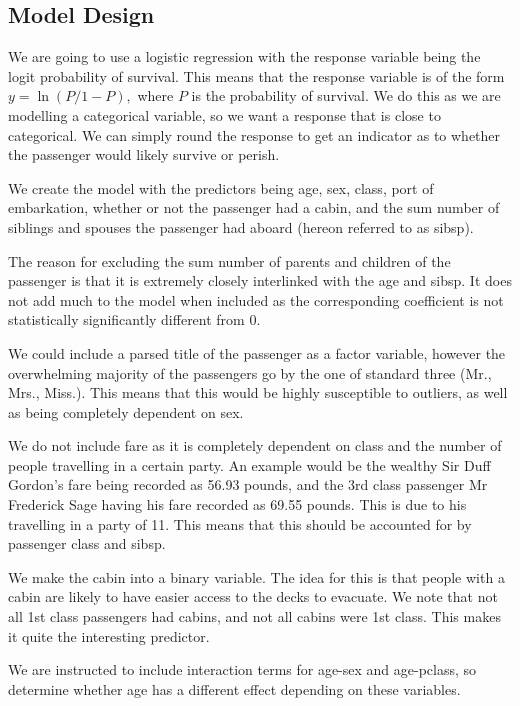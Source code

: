 \documentclass[]{extarticle}
\begin{document}
\subsection{Model Design}

We are going to use a logistic regression with the response variable being the logit probability of survival. This means that the response variable is of the form $y = \ln(P/1-P),$ where $P$ is the probability of survival. We do this as we are modelling a categorical variable, so we want a response that is close to categorical. We can simply round the response to get an indicator as to whether the passenger would likely survive or perish.

We create the model with the predictors being age, sex, class, port of embarkation, whether or not the passenger had a cabin, and the sum number of siblings and spouses the passenger had aboard (hereon referred to as sibsp).

The reason for excluding the sum number of parents and children of the passenger is that it is extremely closely interlinked with the age and sibsp. It does not add much to the model when included as the corresponding coefficient is not statistically significantly different from 0.

We could include a parsed title of the passenger as a factor variable, however the overwhelming majority of the passengers go by the one of standard three (Mr., Mrs., Miss.). This means that this would be highly susceptible to outliers, as well as being completely dependent on sex.

We do not include fare as it is completely dependent on class and the number of people travelling in a certain party. An example would be the wealthy Sir Duff Gordon's fare being recorded as 56.93 pounds, and the 3rd class passenger Mr Frederick Sage having his fare recorded as 69.55 pounds. This is due to his travelling in a party of 11. This means that this should be accounted for by passenger class and sibsp.

We make the cabin into a binary variable. The idea for this is that people with a cabin are likely to have easier access to the decks to evacuate. We note that not all 1st class passengers had cabins, and not all cabins were 1st class. This makes it quite the interesting predictor.

We are instructed to include interaction terms for age-sex and age-pclass, so determine whether age has a different effect depending on these variables.
\end{document}
